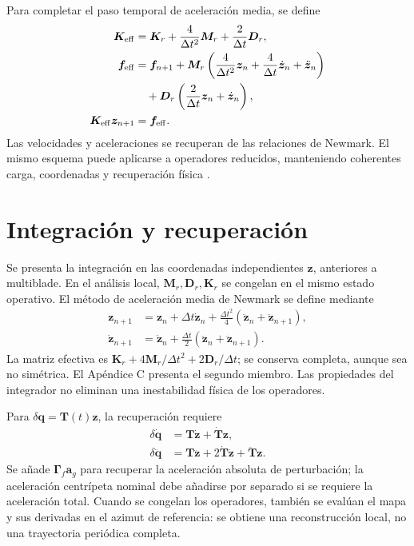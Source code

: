 Para completar el paso temporal de aceleración media, se define
\begin{align}
\bm K_{\rm eff}&=\bm K_r+\frac4{\Delta t^2}\bm M_r+\frac2{\Delta t}\bm D_r,\nonumber\\
\bm f_{\rm eff}&=\bm f_{n+1}
+\bm M_r\left(\frac4{\Delta t^2}\bm z_n+\frac4{\Delta t}\dot{\bm z}_n+\ddot{\bm z}_n\right)\nonumber\\
&\quad+\bm D_r\left(\frac2{\Delta t}\bm z_n+\dot{\bm z}_n\right),\nonumber\\
\bm K_{\rm eff}\bm z_{n+1}&=\bm f_{\rm eff}.
\end{align}
Las velocidades y aceleraciones se recuperan de las relaciones de Newmark. El mismo esquema puede aplicarse a operadores reducidos, manteniendo coherentes carga, coordenadas y recuperación física \citep{newmark1971}.


\section{Integración y recuperación}\label{ap:solucion}

Se presenta la integración en las coordenadas independientes $\bm z$, anteriores a multiblade. En el análisis local, $\bm M_r,\bm D_r,\bm K_r$ se congelan en el mismo estado operativo. El método de aceleración media de Newmark se define mediante
\begin{align}
\bm z_{n+1}&=\bm z_n+\Delta t\dot{\bm z}_n
+\tfrac{\Delta t^2}{4}(\ddot{\bm z}_n+\ddot{\bm z}_{n+1}),\nonumber\\
\dot{\bm z}_{n+1}&=\dot{\bm z}_n+\tfrac{\Delta t}{2}
(\ddot{\bm z}_n+\ddot{\bm z}_{n+1}).
\end{align}
La matriz efectiva es $\bm K_r+4\bm M_r/\Delta t^2+2\bm D_r/\Delta t$; se conserva completa, aunque sea no simétrica. El Apéndice C presenta el segundo miembro. Las propiedades del integrador no eliminan una inestabilidad física de los operadores.

Para $\delta\bm q=\bm T(t)\bm z$, la recuperación requiere
\begin{align}
\delta\dot{\bm q}&=\bm T\dot{\bm z}+\dot{\bm T}\bm z,\nonumber\\
\delta\ddot{\bm q}&=\bm T\ddot{\bm z}+2\dot{\bm T}\dot{\bm z}+\ddot{\bm T}\bm z.
\end{align}
Se añade $\bm\Gamma_f\bm a_g$ para recuperar la aceleración absoluta de perturbación; la aceleración centrípeta nominal debe añadirse por separado si se requiere la aceleración total. Cuando se congelan los operadores, también se evalúan el mapa y sus derivadas en el azimut de referencia: se obtiene una reconstrucción local, no una trayectoria periódica completa.

